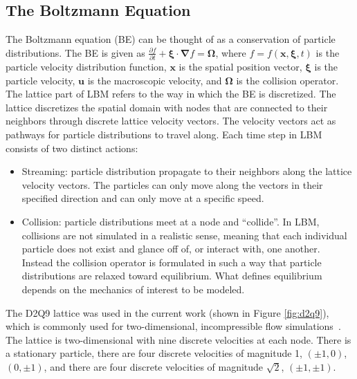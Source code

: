 \documentclass{article}
\newcommand{\pos}{\mathbf{x}}
\newcommand{\pvel}{\boldsymbol{\xi}}
\newcommand{\mvel}{\mathbf{u}}
\newcommand{\cop}{\boldsymbol{\Omega}}
\newcommand{\grad}{\boldsymbol{\nabla}}
\begin{document}
\subsection{The Boltzmann Equation}
The Boltzmann equation (BE) can be thought of as a conservation of particle distributions.
The BE is given as $\frac{\partial f}{\partial t} + \pvel \cdot \grad f = \cop$, where $f = f(\pos, \pvel, t)$ is the particle velocity distribution function, $\pos$ is the spatial position vector, $\pvel$ is the particle velocity, $\mvel$ is the macroscopic velocity, and $\cop$ is the collision operator.
The lattice part of LBM refers to the way in which the BE is discretized.
The lattice discretizes the spatial domain with nodes that are connected to their neighbors through discrete lattice velocity vectors.
The velocity vectors act as pathways for particle distributions to travel along.
Each time step in LBM consists of two distinct actions:

\begin{itemize}
\item Streaming: particle distribution propagate to their neighbors along the lattice velocity vectors.
The particles can only move along the vectors in their specified direction and can only move at a specific speed.
\item Collision: particle distributions meet at a node and ``collide''.
In LBM, collisions are not simulated in a realistic sense, meaning that each individual particle does not exist and glance off of, or interact with, one another.
Instead the collision operator is formulated in such a way that particle distributions are relaxed toward equilibrium.
What defines equilibrium depends on the mechanics of interest to be modeled.
\end{itemize}

The D2Q9 lattice was used in the current work (shown in Figure \ref{fig:d2q9}), which is commonly used for two-dimensional, incompressible flow simulations~\cite{Suc01}. %
The lattice is two-dimensional with nine discrete velocities at each node.
There is a stationary particle, there are four discrete velocities of magnitude 1, $(\pm1,0)$, $(0,\pm1)$, and there are four discrete velocities of magnitude $\sqrt{2}$, $(\pm1, \pm1)$.
\end{document}
